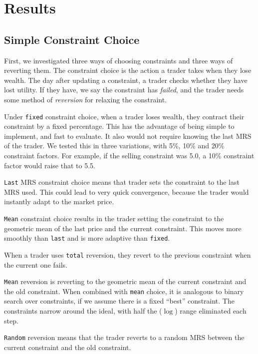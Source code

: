 \documentclass[12pt,a4paper,titlepage]{article}
\newcommand{\co}[1]{\texttt{#1}}
\begin{document}
\section{Results}\label{results}
\subsection{Simple Constraint Choice}
First, we investigated three ways of choosing constraints and three ways of reverting them.
The constraint choice is the action a trader takes when they lose wealth.
The day after updating a constraint, a trader checks whether they have lost utility.
If they have, we say the constraint has \textit{failed}, and the trader needs some method of \textit{reversion} for relaxing the constraint.

Under \co{fixed} constraint choice, when a trader loses wealth, they contract their constraint by a fixed percentage.
This has the advantage of being simple to implement, and fast to evaluate.
It also would not require knowing the last MRS of the trader.
We tested this in three variations, with 5\%, 10\% and 20\% constraint factors.
For example, if the selling constraint was 5.0, a 10\% constraint factor would raise that to 5.5.
    
\co{Last} MRS constraint choice means that trader sets the constraint to the last MRS used.
This could lead to very quick convergence, because the trader would instantly adapt to the market price.

\co{Mean} constraint choice results in the trader setting the constraint to the geometric mean of the last price and the current constraint.
This moves more smoothly than \co{last} and is more adaptive than \co{fixed}.

When a trader uses \co{total} reversion, they revert to the previous constraint when the current one fails.

\co{Mean} reversion is reverting to the geometric mean of the current constraint and the old constraint.
When combined with \co{mean} choice, it is analogous to binary search over constraints, if we assume there is a fixed ``best'' constraint.
The constraints narrow around the ideal, with half the ($\log$) range eliminated each step.

\co{Random} reversion means that the trader reverts to a random MRS between the current constraint and the old constraint.
\end{document}

